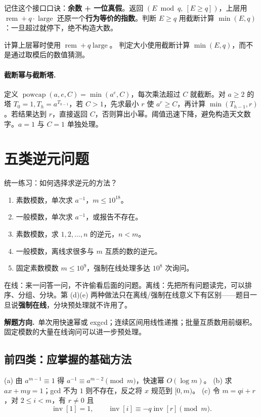 \documentclass[UTF8,a4paper,11pt,twoside,openright,fontset=fandol]{ctexbook}
\theoremstyle{definition}
\newcommand{\iva}[1]{\left[#1\right]}
\newcommand{\hint}{\par\noindent\textbf{解题方向.}\ }
\begin{document}
\begin{tip}
记住这个接口口诀：\textbf{余数 + 一位真假}。返回 $(E\bmod q,\ \iva{E\ge q})$，上层用 $\operatorname{rem}+q\cdot\operatorname{large}$ 还原一个\textbf{行为等价的指数}。判断 $E\ge q$ 用截断计算 $\min(E,q)$：一旦超过就停下，绝不构造大数。
\end{tip}

计算上层幂时使用 $\operatorname{rem}+q\operatorname{large}$。
判定大小使用截断计算 $\min(E,q)$，而不是通过取模后的数值猜测。

\paragraph{截断幂与截断塔.} 定义 $\operatorname{powcap}(a,e,C)=\min(a^e,C)$，每次乘法超过 $C$ 就截断。对 $a\ge2$ 的塔 $T_0=1,T_h=a^{T_{h-1}}$，若 $C>1$，先求最小 $r$ 使 $a^r\ge C$，再计算 $\min(T_{h-1},r)$。若结果达到 $r$，直接返回 $C$，否则算出小幂。阈值迅速下降，避免构造天文数字。$a=1$ 与 $C=1$ 单独处理。


\section{五类逆元问题}
\begin{problem}{统一练习：如何选择求逆元的方法？}
\begin{enumerate}[label=(\alph*)]
\item 素数模数，单次求 $a^{-1}$，$m\le10^{18}$。
\item 一般模数，单次求 $a^{-1}$，或报告不存在。
\item 素数模数，求 $1,2,\ldots,n$ 的逆元，$n<m$。
\item 一般模数，离线求很多与 $m$ 互质的数的逆元。
\item 固定素数模数 $m\le10^9$，强制在线处理多达 $10^8$ 次询问。
\end{enumerate}
\end{problem}

\begin{tip}[在线/离线]
在线：来一问答一问，不许偷看后面的问题。离线：先把所有问题读完，可以排序、分组、分块。第 (d)(e) 两种做法只在离线/强制在线意义下有区别——题目一旦说\textbf{强制在线}，分块预处理就不许用了。
\end{tip}

\hint 单次用快速幂或 exgcd；连续区间用线性递推；批量互质数用前缀积。固定模数的大量在线询问可以进一步预处理。


\subsection{前四类：应掌握的基础方法}
(a) 由 $a^{m-1}\equiv1$ 得 $a^{-1}\equiv a^{m-2}\pmod m$，快速幂 $O(\log m)$。
(b) 求 $ax+my=1$；gcd 不为 $1$ 则不存在，反之将 $x$ 规范到 $[0,m)$。
(c) 令 $m=qi+r$，对 $2\le i<m$，有 $r\ne0$ 且
\[
 \operatorname{inv}[1]=1,\qquad
 \operatorname{inv}[i]\equiv-q\operatorname{inv}[r]\pmod m.
\]
\end{document}
